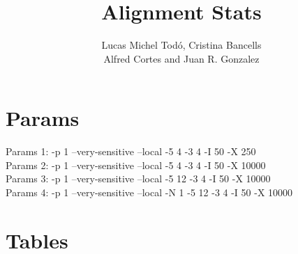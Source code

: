 \documentclass[12pt, a4paper]{article}\usepackage[]{graphicx}\usepackage[]{color}
\title{\textbf{\Large Alignment Stats}}
\author {Lucas Michel Todó, Cristina Bancells\\
Alfred Cortes and Juan R. Gonzalez}
\affil{Barcelona Global Health Institute (ISGlobal), Campus PRBB}
\begin{document}
\maketitle
\tableofcontents
\newpage



\section{Params}
Params 1: -p 1 --very-sensitive --local -5 4 -3 4 -I 50 -X 250 \\
Params 2: -p 1 --very-sensitive --local -5 4 -3 4 -I 50 -X 10000 \\
Params 3: -p 1 --very-sensitive --local -5 12 -3 4 -I 50 -X 10000 \\
Params 4: -p 1 --very-sensitive --local -N 1 -5 12 -3 4 -I 50 -X 10000 \\




\section{Tables}
\end{document}
